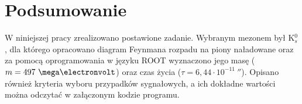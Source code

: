 \section{Podsumowanie}
W niniejszej pracy zrealizowano postawione zadanie. Wybranym mezonem był 
K$^0_s$, dla którego opracowano diagram Feynmana rozpadu na piony naładowane 
oraz za pomocą oprogramowania w języku ROOT wyznaczono jego masę ($m=497\ \mega\electronvolt$) oraz czas życia ($\tau=6,44 \cdot 10^{-11}\ \second$).
Opisano również kryteria wyboru przypadków sygnałowych, a ich dokładne wartości można odczytać w załączonym kodzie
programu.